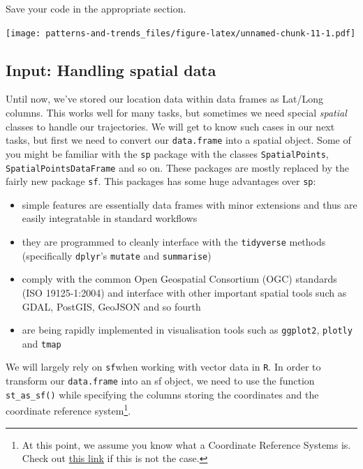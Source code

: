 \documentclass[]{book}
\providecommand{\tightlist}{%
  \setlength{\itemsep}{0pt}\setlength{\parskip}{0pt}}
\let\rmarkdownfootnote\footnote%
\def\footnote{\protect\rmarkdownfootnote}
\begin{document}
Save your code in the appropriate section.

\texttt{[image: patterns-and-trends\_files/figure-latex/unnamed-chunk-11-1.pdf]}

\subsection{Input: Handling spatial
data}\label{input-handling-spatial-data}

Until now, we've stored our location data within data frames as Lat/Long
columns. This works well for many tasks, but sometimes we need special
\emph{spatial} classes to handle our trajectories. We will get to know
such cases in our next tasks, but first we need to convert our
\texttt{data.frame} into a spatial object. Some of you might be familiar
with the \texttt{sp} package with the classes \texttt{SpatialPoints},
\texttt{SpatialPointsDataFrame} and so on. These packages are mostly
replaced by the fairly new package \texttt{sf}. This packages has some
huge advantages over \texttt{sp}:

\begin{itemize}
\tightlist
\item
  simple features are essentially data frames with minor extensions and
  thus are easily integratable in standard workflows
\item
  they are programmed to cleanly interface with the \texttt{tidyverse}
  methods (specifically \texttt{dplyr}'s \texttt{mutate} and
  \texttt{summarise})
\item
  comply with the common Open Geospatial Consortium (OGC) standards (ISO
  19125-1:2004) and interface with other important spatial tools such as
  GDAL, PostGIS, GeoJSON and so fourth
\item
  are being rapidly implemented in visualisation tools such as
  \texttt{ggplot2}, \texttt{plotly} and \texttt{tmap}
\end{itemize}

We will largely rely on \texttt{sf}when working with vector data in
\texttt{R}. In order to transform our \texttt{data.frame} into an sf
object, we need to use the function \texttt{st\_as\_sf()} while
specifying the columns storing the coordinates and the coordinate
reference system\footnote{At this point, we assume you know what a
  Coordinate Reference Systems is. Check out
  \href{https://earthdatascience.org/courses/earth-analytics/spatial-data-r/intro-to-coordinate-reference-systems/}{this
  link} if this is not the case.}.
\end{document}
